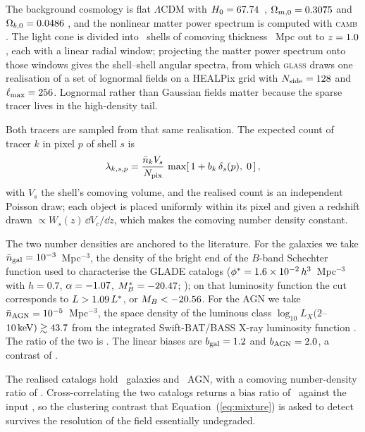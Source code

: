 The background cosmology is flat $\Lambda$CDM with $H_0 = 67.74$~\kmsmpc,
$\Omega_{m,0} = 0.3075$ and $\Omega_{b,0} = 0.0486$
\citep{Planck2015}, and the nonlinear matter power spectrum is computed with
\textsc{camb} \citep{Lewis2000}. The light cone is divided into \FieldNshell\
shells of comoving thickness \FieldShellDx~Mpc out to $z = 1.0$, each
with a linear radial window; projecting the matter power spectrum onto those
windows gives the shell--shell angular spectra, from which \textsc{glass}
\citep{Tessore2023} draws one realisation of a set of lognormal fields on a
HEALPix \citep{Gorski2005} grid with $N_{\rm side} = 128$ and $\ell_{\rm max} =
256$. Lognormal rather than Gaussian fields matter because the sparse
tracer lives in the high-density tail.

Both tracers are sampled from that same realisation. The expected count of
tracer $k$ in pixel $p$ of shell $s$ is
\begin{equation}
  \lambda_{k,s,p} = \frac{\bar{n}_k V_{s}}{N_{\rm pix}}\,
     \max\!\left[\, 1 + b_k\, \delta_s(p),\; 0 \,\right],
  \label{eq:poisson}
\end{equation}
with $V_s$ the shell's comoving volume, and the realised count is an
independent Poisson draw; each object is placed uniformly within its pixel and
given a redshift drawn $\propto W_s(z)\,\dd V_c/\dd z$, which makes the comoving
number density constant.

The two number densities are anchored to the literature. For the galaxies we
take $\bar{n}_{\rm gal} = 10^{-3}$~Mpc$^{-3}$, the density of the bright end of
the $B$-band Schechter \citep{Schechter1976} function used to characterise the GLADE catalogs
($\phi^* = 1.6\times10^{-2}\,h^3$~Mpc$^{-3}$ with $h = 0.7$,
$\alpha = -1.07$,
$M_B^* = -20.47$; \citealt{Dalya2018, Dalya2022}); on that luminosity
function the cut corresponds to $L > 1.09\,L^*$, or
$M_B < -20.56$. For the AGN we take $\bar{n}_{\rm AGN} = 10^{-5}$~Mpc$^{-3}$,
the space density of the luminous class $\log_{10} L_X(2$--$10\,{\rm keV})
\gtrsim 43.7$ from the integrated Swift-BAT/BASS X-ray luminosity function
\citep{Ananna2022}. The ratio of the two is \DensityRatioTarget. The linear
biases are $b_{\rm gal} = 1.2$ and $b_{\rm AGN} = 2.0$, a contrast of
\BiasRatio.

The realised catalogs hold \CatNgal\ galaxies and \CatNagn\ AGN, with a
comoving number-density ratio of \DensityRatio. Cross-correlating the two
catalogs returns a bias ratio of \BiasRatioMeas\ against the input
\BiasRatio, so the clustering contrast that
Equation~(\ref{eq:mixture}) is asked to detect survives the resolution of the
field essentially undegraded.

